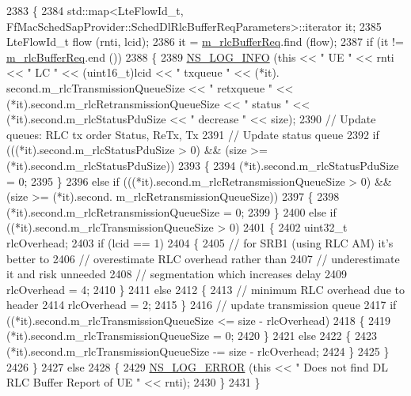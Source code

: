 \begin{DoxyCode}
2383 \{
2384   std::map<LteFlowId\_t, FfMacSchedSapProvider::SchedDlRlcBufferReqParameters>::iterator it;
2385   LteFlowId\_t flow (rnti, lcid);
2386   it = \hyperlink{classns3_1_1FdTbfqFfMacScheduler_a1de1056077db96c215eb47ef724e1167}{m\_rlcBufferReq}.find (flow);
2387   \textcolor{keywordflow}{if} (it != \hyperlink{classns3_1_1FdTbfqFfMacScheduler_a1de1056077db96c215eb47ef724e1167}{m\_rlcBufferReq}.end ())
2388     \{
2389       \hyperlink{group__logging_gafbd73ee2cf9f26b319f49086d8e860fb}{NS\_LOG\_INFO} (\textcolor{keyword}{this} << \textcolor{stringliteral}{" UE "} << rnti << \textcolor{stringliteral}{" LC "} << (uint16\_t)lcid << \textcolor{stringliteral}{" txqueue "} << (*it).
      second.m\_rlcTransmissionQueueSize << \textcolor{stringliteral}{" retxqueue "} << (*it).second.m\_rlcRetransmissionQueueSize << \textcolor{stringliteral}{" status "} 
      << (*it).second.m\_rlcStatusPduSize << \textcolor{stringliteral}{" decrease "} << size);
2390       \textcolor{comment}{// Update queues: RLC tx order Status, ReTx, Tx}
2391       \textcolor{comment}{// Update status queue}
2392       \textcolor{keywordflow}{if} (((*it).second.m\_rlcStatusPduSize > 0) && (size >= (*it).second.m\_rlcStatusPduSize))
2393         \{
2394            (*it).second.m\_rlcStatusPduSize = 0;
2395         \}
2396       \textcolor{keywordflow}{else} \textcolor{keywordflow}{if} (((*it).second.m\_rlcRetransmissionQueueSize > 0) && (size >= (*it).second.
      m\_rlcRetransmissionQueueSize))
2397         \{
2398           (*it).second.m\_rlcRetransmissionQueueSize = 0;
2399         \}
2400       \textcolor{keywordflow}{else} \textcolor{keywordflow}{if} ((*it).second.m\_rlcTransmissionQueueSize > 0)
2401         \{
2402           uint32\_t rlcOverhead;
2403           \textcolor{keywordflow}{if} (lcid == 1)
2404             \{
2405               \textcolor{comment}{// for SRB1 (using RLC AM) it's better to}
2406               \textcolor{comment}{// overestimate RLC overhead rather than}
2407               \textcolor{comment}{// underestimate it and risk unneeded}
2408               \textcolor{comment}{// segmentation which increases delay }
2409               rlcOverhead = 4;                                  
2410             \}
2411           \textcolor{keywordflow}{else}
2412             \{
2413               \textcolor{comment}{// minimum RLC overhead due to header}
2414               rlcOverhead = 2;
2415             \}
2416           \textcolor{comment}{// update transmission queue}
2417           \textcolor{keywordflow}{if} ((*it).second.m\_rlcTransmissionQueueSize <= size - rlcOverhead)
2418             \{
2419               (*it).second.m\_rlcTransmissionQueueSize = 0;
2420             \}
2421           \textcolor{keywordflow}{else}
2422             \{                    
2423               (*it).second.m\_rlcTransmissionQueueSize -= size - rlcOverhead;
2424             \}
2425         \}
2426     \}
2427   \textcolor{keywordflow}{else}
2428     \{
2429       \hyperlink{group__logging_ga0261a8db1d4ac5f79417d117634fd455}{NS\_LOG\_ERROR} (\textcolor{keyword}{this} << \textcolor{stringliteral}{" Does not find DL RLC Buffer Report of UE "} << rnti);
2430     \}
2431 \}
\end{DoxyCode}


